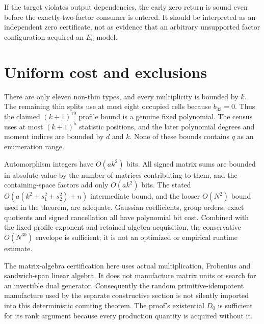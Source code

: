 \documentclass[11pt]{article}
\begin{document}
If the target violates output dependencies, the early zero return is
sound even before the exactly-two-factor consumer is entered. It should
be interpreted as an independent zero certificate, not as evidence that
an arbitrary unsupported factor configuration acquired an $E_6$ model.

\section{Uniform cost and exclusions}
There are only eleven non-thin types, and every multiplicity is bounded
by $k$. The remaining thin splits use at most eight occupied cells because
$b_{33}=0$. Thus the claimed $(k+1)^{19}$ profile bound is a genuine fixed
polynomial. The census uses at most $(k+1)^5$ statistic positions, and
the later polynomial degrees and moment indices are bounded by $d$ and
$k$. None of these bounds contains $q$ as an enumeration range.

Automorphism integers have $O(ak^2)$ bits. All signed matrix sums are
bounded in absolute value by the number of matrices contributing to
them, and the containing-space factors add only $O(ak^2)$ bits.
The stated $O(a(k^2+s_1^2+s_2^2)+n)$ intermediate bound, and the looser
$O(N^2)$ bound used in the theorem, are adequate. Gaussian coefficients,
group orders, exact quotients and signed cancellation all have polynomial
bit cost. Combined with the fixed profile exponent and retained algebra
acquisition, the conservative $O(N^{30})$ envelope is sufficient; it is
not an optimized or empirical runtime estimate.

The matrix-algebra certification here uses actual multiplication,
Frobenius and sandwich-span linear algebra. It does not manufacture
matrix units or search for an invertible dual generator. Consequently
the random primitive-idempotent manufacture used by the separate
constructive section is not silently imported into this deterministic
counting theorem. The proof's existential $D_0$ is sufficient for its
rank argument because every production quantity is acquired without it.
\end{document}
